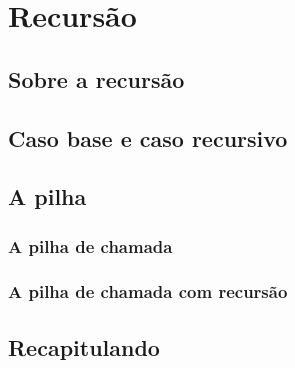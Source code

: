 \documentclass{report}
\begin{document}
	\chapter{Recursão}
	
	\section{Sobre a recursão}
	
	\section{Caso base e caso recursivo}
	
	\section{A pilha}
	
	\subsection{A pilha de chamada}
	
	\subsection{A pilha de chamada com recursão}
	
	\section{Recapitulando}
	
	
	
	
\end{document}
